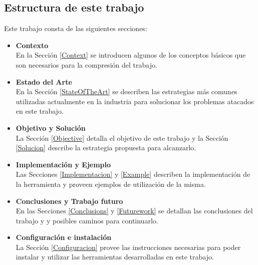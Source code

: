 \bigskip

\subsection{Estructura de este trabajo}
\noindent Este trabajo consta de las siguientes secciones:

\begin{itemize}
	\item \textbf{Contexto}\\
		En la Sección \ref{Context} se introducen algunos de los conceptos básicos que
		son necesarios para la compresión del trabajo.
	\item \textbf{Estado del Arte}\\
		En la Sección \ref{StateOfTheArt} se describen las estrategias más comunes
		utilizadas actualmente en la industria para solucionar los problemas atacados
		en este trabajo.
	\item \textbf{Objetivo y Solución}\\
		La Sección \ref{Objective} detalla el objetivo de este trabajo y la Sección
		\ref{Solucion} describe la estrategia propuesta para alcanzarlo.
	\item \textbf{Implementación y Ejemplo}\\
		Las Secciones \ref{Implementacion} y \ref{Example} describen la
		implementación de la herramienta y proveen ejemplos de utilización de la misma.
	\item \textbf{Conclusiones y Trabajo futuro}\\
		En las Secciones \ref{Conclusions} y \ref{Futurework} se detallan las
		conclusiones del trabajo y y posibles caminos para continuarlo.
	\item \textbf{Configuración e instalación}\\
		La Sección \ref{Configuracion} provee las instrucciones necesarias para poder instalar 
		y utilizar las herramientas desarrolladas en este trabajo. 
\end{itemize}
